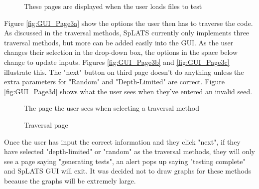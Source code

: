   \begin{figure}
    \centering
    \caption{These pages are displayed when the user loads files to test}
    \label{fig:GUI_LoadVersions}
  \end{figure}
  
  Figure \ref{fig:GUI_Page3a} show the options the user then has to traverse the code. As discussed in the traversal methods, SpLATS currently only implements three traversal methods, but more can be added easily into the GUI. As the user changes their selection in the drop-down box, the options in the space below change to update inputs. Figures \ref{fig:GUI_Page3b} and \ref{fig:GUI_Page3c} illustrate this. The "next" button on third page doesn't do anything unless the extra parameters for "Random" and "Depth-Limited" are correct. Figure \ref{fig:GUI_Page3d} shows what the user sees when they've entered an invalid seed.
  
  \begin{figure}
    \centering
    \caption{The page the user sees when selecting a traversal method}
    \label{fig:GUI_SelectTraversal1}
  \end{figure}
  
  \begin{figure}
    \centering
    \caption{Traversal page}
    \label{fig:GUI_SelectTraversal2}
  \end{figure}
  
  Once the user has input the correct information and they click "next", if they have selected "depth-limited" or "random" as the traversal methods, they will only see a page saying "generating tests", an alert pops up saying "testing complete" and SpLATS GUI will exit. It was decided not to draw graphs for these methods because the graphs will be extremely large.
  
